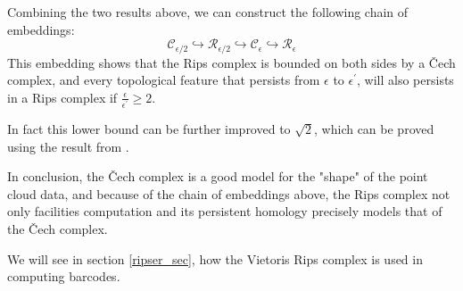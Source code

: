 \documentclass[11pt,a4paper]{report}
\begin{document}
            Combining the two results above, we can construct the following chain of embeddings:
            \[
             \mathcal{C}_{\epsilon/2} \hookrightarrow \mathcal{R}_{\epsilon/2} \hookrightarrow \mathcal{C}_\epsilon \hookrightarrow \mathcal{R}_{\epsilon}
            \]
            This embedding shows that the Rips complex is bounded on both sides by a \v{C}ech complex, and every topological feature that persists from $\epsilon$ to $\epsilon^\prime$, will also persists in a Rips complex if  $\frac{\epsilon}{\epsilon^\prime} \geq 2$. 
            
            In fact this lower bound can be further improved to $\sqrt{2}$, which can be proved using the result from \cite{Silva_Ghrist_2007}. 
            
            In conclusion, the \v{C}ech complex is a good model for the "shape" of the point cloud data, 
            and because of the chain of embeddings above, the Rips complex not only facilities computation and its persistent homology precisely models that of the \v{C}ech complex.
            
            We will see in section \ref{ripser_sec}, how the Vietoris Rips complex is used in computing barcodes. 

              


    
\end{document}

